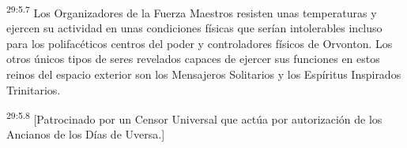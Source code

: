 \par
\textsuperscript{29:5.7} Los Organizadores de la Fuerza Maestros resisten unas temperaturas y ejercen su actividad en unas condiciones físicas que serían intolerables incluso para los polifacéticos centros del poder y controladores físicos de Orvonton. Los otros únicos tipos de seres revelados capaces de ejercer sus funciones en estos reinos del espacio exterior son los Mensajeros Solitarios y los Espíritus Inspirados Trinitarios.

\par
\textsuperscript{29:5.8} [Patrocinado por un Censor Universal que actúa por autorización de los Ancianos de los Días de Uversa.]